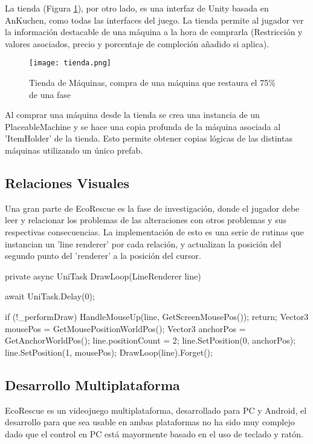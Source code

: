 La tienda (Figura \ref{fig:tienda}), por otro lado, es una interfaz de Unity basada en AnKuchen\cite{AnKuchen}, como todas las interfaces del juego. La tienda permite al jugador ver la información destacable de una máquina a la hora de comprarla (Restricción y valores asociados, precio y porcentaje de compleción añadido si aplica). 

\begin{figure}[H]
\centering
    \texttt{[image: tienda.png]}
\caption{Tienda de Máquinas, compra de una máquina que restaura el 75\% de una fase}
\label{fig:tienda}
\end{figure}

Al comprar una máquina desde la tienda se crea una instancia de un PlaceableMachine y se hace una copia profunda de la máquina asociada al 'ItemHolder' de la tienda. Esto permite obtener copias lógicas de las distintas máquinas utilizando un único prefab.


\subsection{Relaciones Visuales}

Una gran parte de EcoRescue es la fase de investigación, donde el jugador debe leer y relacionar los problemas de las alteraciones con otros problemas y sus respectivas consecuencias. La implementación de esto es una serie de rutinas que instancian un 'line renderer' por cada relación, y actualizan la posición del segundo punto del 'renderer' a la posición del cursor.

\begin{mypython}[caption={Código para dibujar la línea de relaciones.},label={alg:drawloop}]
private async UniTask DrawLoop(LineRenderer line) 
{
    await UniTask.Delay(0);
    
    if (!_performDraw) 
    {
        HandleMouseUp(line, GetScreenMousePos());
        return;
    }
    Vector3 mousePos = GetMousePositionWorldPos();
    Vector3 anchorPos = GetAnchorWorldPos();
    line.positionCount = 2;
    line.SetPosition(0, anchorPos);
    line.SetPosition(1, mousePos);
    DrawLoop(line).Forget();
}
\end{mypython}

\subsection{Desarrollo Multiplataforma}

EcoRescue es un videojuego multiplataforma, desarrollado para PC y Android, el desarrollo para que sea usable en ambas plataformas no ha sido muy complejo dado que el control en PC está mayormente basado en el uso de teclado y ratón.

